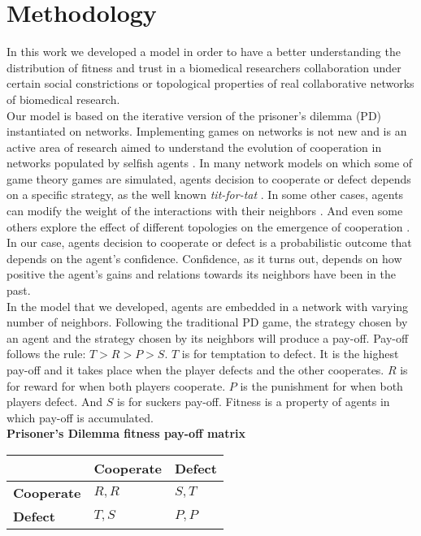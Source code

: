 \section{Methodology}
\label{sec:2}
In this work we developed a model in order to have a better
understanding the distribution of fitness and trust in a biomedical
researchers collaboration under certain social constrictions or
topological properties of real collaborative networks of biomedical
research.\\

Our model is based on the iterative version of the prisoner's dilemma (PD)
instantiated on networks. Implementing games on networks is not new
and is an active area of research aimed to understand the evolution of
cooperation in networks populated by selfish agents
\cite{Nowak1992,Nowak2006}. In many network models on which some of game
theory games are simulated, agents decision to cooperate or defect
depends on a specific strategy, as the well known \textit{tit-for-tat}
\cite{Axelrod2006,Nowak2011}. In some other cases, agents can modify the weight
of the interactions with their neighbors \cite{Santos2006}. And even
some others explore the effect of different topologies on the
emergence of cooperation \cite{Santos2005}. In our case, agents decision
to cooperate or defect is a probabilistic outcome that depends on the
agent's confidence. Confidence, as it turns out, depends on how
positive the agent's gains and relations towards its neighbors
have been in the past. \\

In the model that we developed, agents are embedded in a network with
varying number of neighbors. Following the traditional PD game, the
strategy chosen by an agent and the strategy chosen by its neighbors
will produce a pay-off. Pay-off follows the rule: $T > R > P > S$. $T$
is for temptation to defect. It is the highest pay-off and it takes
place when the player defects and the other cooperates. $R$ is for
reward for when both players cooperate. $P$ is the punishment for when
both players defect. And $S$ is for suckers pay-off. Fitness is a
property of agents in which pay-off is accumulated.\\ 

{\bf Prisoner's Dilemma fitness pay-off matrix}\\

\begin{tabular}{| l | l | l |}
\hline
          & \bf{Cooperate} & \bf{Defect} \\ \hline
\bf{Cooperate} &  $R,R$      &  $S,T$   \\ \hline
\bf{Defect}    &  $T,S$      &  $P,P$   \\ \hline

\end{tabular}\\ \\

